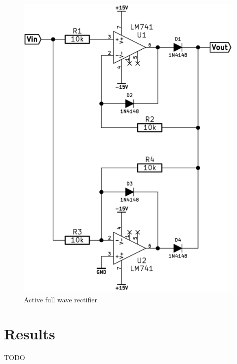 \documentclass[11pt,a4paper]{article}
\begin{document}
\begin{figure}[htbp]
\centering
\includegraphics[scale=0.5]{img/fwr.png}
\caption{Active full wave rectifier}
\end{figure}

\section{Results}\label{setup}
TODO
\end{document}
